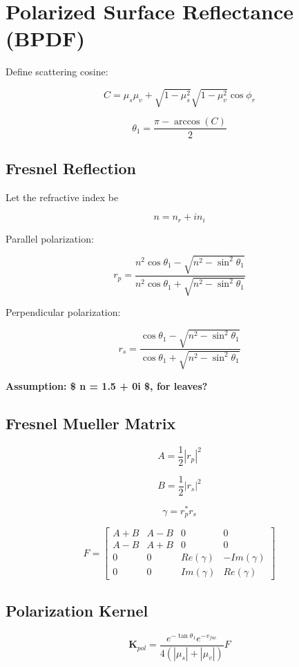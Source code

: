 \documentclass[
  letterpaper,
]{scrbook}
\begin{document}
\section{Polarized Surface Reflectance
(BPDF)}\label{polarized-surface-reflectance-bpdf}

Define scattering cosine:

\[
C =
\mu_s\mu_v +
\sqrt{1-\mu_s^2}\sqrt{1-\mu_v^2}\cos\phi_r
\]

\[
\theta_1 =
\frac{\pi - \arccos(C)}{2}
\]

\subsection{Fresnel Reflection}\label{fresnel-reflection}

Let the refractive index be

\[
n = n_r + i n_i
\]

Parallel polarization:

\[
r_p =
\frac{n^2\cos\theta_1 - \sqrt{n^2-\sin^2\theta_1}}
{n^2\cos\theta_1 + \sqrt{n^2-\sin^2\theta_1}}
\]

Perpendicular polarization:

\[
r_s =
\frac{\cos\theta_1 - \sqrt{n^2-\sin^2\theta_1}}
{\cos\theta_1 + \sqrt{n^2-\sin^2\theta_1}}
\]

\textbf{Assumption: \$ n = 1.5 + 0i \$, for leaves?}

\subsection{Fresnel Mueller Matrix}\label{fresnel-mueller-matrix}

\[
A = \frac{1}{2}|r_p|^2
\]

\[
B = \frac{1}{2}|r_s|^2
\]

\[
\gamma = r_p^* r_s
\]

\[
F =
\begin{bmatrix}
A+B & A-B & 0 & 0 \\
A-B & A+B & 0 & 0 \\
0 & 0 & Re(\gamma) & -Im(\gamma) \\
0 & 0 & Im(\gamma) & Re(\gamma)
\end{bmatrix}
\]

\subsection{Polarization Kernel}\label{polarization-kernel}

\[
\mathbf{K}_{pol} =
\frac{
e^{-\tan\theta_1}e^{-v_{fac}}
}{4(|\mu_s|+|\mu_v|)}
F
\]
\end{document}
